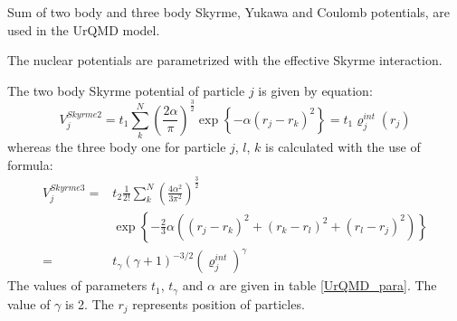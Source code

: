 Sum of two body and three body Skyrme, Yukawa and Coulomb potentials, are used in the UrQMD model.


 

The nuclear potentials are parametrized with the effective Skyrme interaction.


The two body Skyrme potential of particle $j$ is given by equation:
\begin{equation}
    V^{Skyrme2}_j=t_1\sum_{k}^{N}\left(\frac{2\alpha}{\pi}\right)^\frac{3}{2}\exp\left\{-\alpha(r_j-r_k)^2\right\}= t_{1}\varrho_j^{int}(r_j)
\end{equation}
whereas the three body one for particle $j$, $l$, $k$ is calculated with the use of formula:
\begin{equation}
\begin{aligned}
    V^{Skyrme3}_j= &t_2\frac{1}{2!}\sum_{k}^{N}\left(\frac{4\alpha^2}{3\pi^2}\right)^\frac{3}{2}\\
    &\exp\left\{-\frac{2}{3}\alpha\left((r_j-r_k)^2+(r_k-r_l)^2+(r_l-r_j)^2\right)\right\}\\
    =& t_{\gamma}(\gamma +1)^{-3/2}(\varrho_j^{int})^{\gamma}
\end{aligned}
\end{equation}
The values of parameters $t_1$, $t_\gamma$ and $\alpha$ are given in table \ref{UrQMD_para}. The value of $\gamma$ is 2. The $r_j$ represents position of particles.

